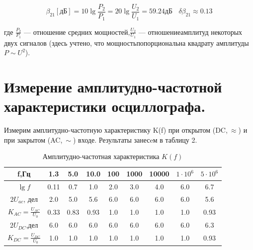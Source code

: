 \documentclass{article}
\begin{document}
\begin{equation*}
\beta_{21}[дБ]=10\lg\frac{P_2}{P_1}=20\lg\frac{U_2}{U_1}=59.24дБ \: \: \: \: \delta \beta_{21} \approx 0.13
\end{equation*}

где $\frac{P_2}{P_1}$ — отношение средних мощностей,$\frac{U_2}{U_1}$ — отношениеамплитуд некоторых двух сигналов (здесь учтено, что мощностьпопорциональна квадрату амплитуды $P \sim U^2$).

\newpage

\section{Измерение амплитудно-частотной характеристики осциллографа.}

Измерим амплитудно-частотную характеристику K(f) при открытом (DC,$\:\approx$) и при закрытом (AC,$\:\sim$) входе. Результаты занесeм в таблицу 2.

\begin{table}[h!]
\begin{center}
\caption{Амплитудно-частотная характеристика $K(f)$}
\begin{tabular}{|c|c|c|c|c|c|c|c|c|}
\hline
f,Гц&1.3&5.0&10.0&100&1000&10000&$1 \cdot 10^6$&$5 \cdot 10^6$ \\
\hline
$\lg f$&0.11&0.7&1.0&2.0&3.0&4.0&6.0&6.7 \\
\hline
$2U_{ac}$, дел&2.0&5.0&5.6&6.0&6.0&6.0&6.0&5.6 \\
\hline
$K_{AC} = \frac{U_{AC}}{U_0}$&0.33&0.83&0.93&1.0&1.0&1.0&1.0&0.93 \\
\hline
$2U_{DC}$,дел&6.0&6.0&6.0&6.0&6.0&6.0&6.0&6.3 \\
\hline
$K_{DC} = \frac{U_{DC}}{U_0}$&1.0&1.0&1.0&1.0&1.0&1.0&1.0&0.93 \\
\hline
\end{tabular}
\end{center}
\end{table}

\end{document}
